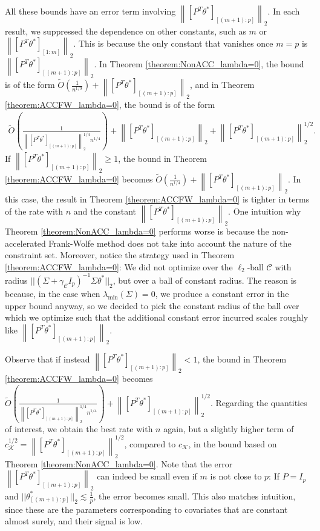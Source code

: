 \documentclass{article}
\begin{document}
All these bounds have an error term involving $\left\|[P^T\theta^*]_{[(m+1):p]}\right\|_2$. In each result, we suppressed the dependence on other constants, such as $m$ or $\left\|[P^T\theta^*]_{[1:m]}\right\|_2$. This is because the only constant that vanishes once $m = p$ is $\left\|[P^T\theta^*]_{[(m+1):p]}\right\|_2$. In Theorem \ref{theorem:NonACC_lambda=0}, the bound is of the form $\widetilde{O}\left(\frac{1}{n^{1/9}}\right) + \left\|[P^T\theta^*]_{[(m+1):p]}\right\|_2$, and in Theorem \ref{theorem:ACCFW_lambda=0}, the bound is of the form 
\begin{align*}
\widetilde{O}\left(\frac{1}{\left\|[P^T\theta^*]_{[(m+1):p]}\right\|_2^{1/4}n^{1/4}}\right) + \left\|[P^T\theta^*]_{[(m+1):p]}\right\|_2 + \left\|[P^T\theta^*]_{[(m+1):p]}\right\|_2^{1/2}.
\end{align*}
If $\left\|[P^T\theta^*]_{[(m+1):p]}\right\|_2 \geq 1$, the bound in Theorem \ref{theorem:ACCFW_lambda=0} becomes $\widetilde{O}\left(\frac{1}{n^{1/4}}\right) + \left\|[P^T\theta^*]_{[(m+1):p]}\right\|_2$. In this case, the result in Theorem \ref{theorem:ACCFW_lambda=0} is tighter in terms of the rate with $n$ and the constant $\left\|[P^T\theta^*]_{[(m+1):p]}\right\|_2$. One intuition why Theorem \ref{theorem:NonACC_lambda=0} performs worse is because the non-accelerated Frank-Wolfe method does not take into account the nature of the constraint set. Moreover, notice the strategy used in Theorem \ref{theorem:ACCFW_lambda=0}: We did not optimize over the $\ell_2$-ball $\mathcal{C}$ with radius $||(\Sigma + \gamma_{\mathcal{C}}I_p)^{-1}\Sigma\theta^*||_2$, but over a ball of constant radius. The reason is because, in the case when $\lambda_{\min}(\Sigma) = 0$, we produce a constant error in the upper bound anyway, so we decided to pick the constant radius of the ball over which we optimize such that the additional constant  error incurred scales roughly like $\left\|[P^T\theta^*]_{[(m+1):p]}\right\|_2$. 

Observe that if instead $\left\|[P^T\theta^*]_{[(m+1):p]}\right\|_2 < 1$, the bound in Theorem \ref{theorem:ACCFW_lambda=0} becomes $\widetilde{O}\left(\frac{1}{\left\|[P^T\theta^*]_{[(m+1):p]}\right\|_2^{1/4}n^{1/4}}\right) + \left\|[P^T\theta^*]_{[(m+1):p]}\right\|_2^{1/2}$. Regarding the quantities of interest, we obtain the best rate with $n$ again, but a slightly higher term of $c_{\mathcal{K}}^{1/2} = \left\|[P^T\theta^*]_{[(m+1):p]}\right\|_2^{1/2}$, compared to $c_{\mathcal{K}}$, in the bound based on Theorem \ref{theorem:NonACC_lambda=0}. Note that the error $\left\|[P^T\theta^*]_{[(m+1):p]}\right\|_2$ can indeed be small even if $m$ is not close to $p$: If $P = I_p$ and $||\theta^*_{[(m+1):p]}||_2 \lesssim \frac{1}{p}$, the error becomes small. This also matches intuition, since these are the parameters corresponding to covariates that are constant almost surely, and their signal is low.
\end{document}
